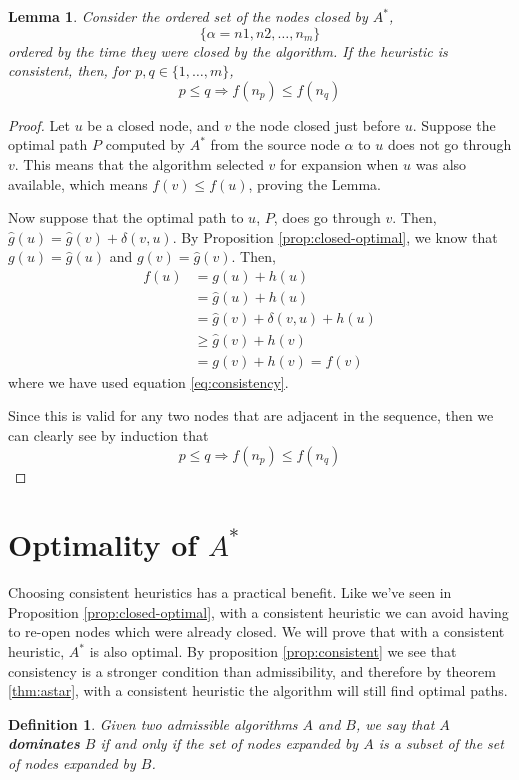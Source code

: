\documentclass[a4paper,10pt]{report}
\newtheorem{definition}[theorem]{Definition}
\newtheorem{lemma}[theorem]{Lemma}
\begin{document}
\begin{lemma}
\label{lemma:order}
Consider the ordered set of the nodes closed by $A^*$, 
\[ \{ \alpha = n1, n2, \dots, n_m \} \]
ordered by the time they were closed by the algorithm. If the heuristic is consistent, then, for $p, q \in \{ 1, \dots, m \}$,
\[ p \leq q \Rightarrow f(n_p) \leq f(n_q) \]
\end{lemma}
\begin{proof}
Let $u$ be a closed node, and $v$ the node closed just before $u$. Suppose the optimal path $P$ computed by $A^*$ from the source node $\alpha$ to $u$ does not go through $v$. This means that the algorithm selected $v$ for expansion when $u$ was also available, which means $f(v) \leq f(u)$, proving the Lemma.

Now suppose that the optimal path to $u$, $P$, does go through $v$. Then, $\hat{g}(u) = \hat{g}(v) + \delta(v, u)$. By Proposition \ref{prop:closed-optimal}, we know that $g(u) = \hat{g}(u)$ and $g(v) = \hat{g}(v)$. Then,
\begin{align*}
f(u) &= g(u) + h(u)\\
&= \hat{g}(u) + h(u)\\
&= \hat{g}(v) + \delta(v, u) + h(u)\\
&\geq \hat{g}(v) + h(v)\\
&= g(v) + h(v) = f(v)
\end{align*}
where we have used equation \ref{eq:consistency}.

Since this is valid for any two nodes that are adjacent in the sequence, then we can clearly see by induction that
\[ p \leq q \Rightarrow f(n_p) \leq f(n_q) \]
\end{proof}


\section{Optimality of $A^*$}
Choosing consistent heuristics has a practical benefit. Like we've seen in Proposition \ref{prop:closed-optimal}, with a consistent heuristic we can avoid having to re-open nodes which were already closed. We will prove that with a consistent heuristic, $A^*$ is also optimal. By proposition \ref{prop:consistent} we see that consistency is a stronger condition than admissibility, and therefore by theorem \ref{thm:astar}, with a consistent heuristic the algorithm will still find optimal paths.

\begin{definition}
Given two admissible algorithms $A$ and $B$, we say that $A$ \textbf{dominates} $B$ if and only if the set of nodes expanded by $A$ is a subset of the set of nodes expanded by $B$.
\end{definition}
\end{document}
